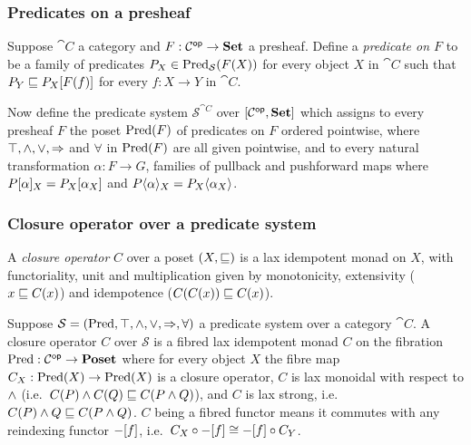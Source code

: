 \subsubsection{Predicates on a presheaf}

Suppose $\cat{C}$ a category and $F: \mathcal{C}^{\mathsf{op}} \to \mathbf{Set}$ a presheaf. Define a \emph{predicate on $F$} to be
a family of predicates $P_X \in \mathrm{Pred}_\mathcal{S}(F(X))$ for every object $X$ in $\cat{C}$ such that $P_Y
\sqsubseteq P_X[F(f)]$ for every $f: X \to Y$ in $\cat{C}$.

Now define the predicate system $\mathcal{S}^{\cat{C}}$ over $[\mathcal{C}^{\mathsf{op}},\mathbf{Set}]$ which assigns to every
presheaf $F$ the poset $\mathrm{Pred}(F)$ of predicates on $F$ ordered pointwise, where $\top, \wedge, \vee,
\Rightarrow$ and $\forall$ in $\mathrm{Pred}(F)$ are all given pointwise, and to every natural transformation $\alpha: F
\to G$, families of pullback and pushforward maps where $P[\alpha]_X = P_X[\alpha_X]$ and
$P\langle\alpha\rangle_X = P_X\langle\alpha_X\rangle$.

\subsubsection{Closure operator over a predicate system}

A \emph{closure operator} $C$ over a poset $(X, \sqsubseteq)$ is a lax idempotent monad on $X$, with functoriality,
unit and multiplication given by monotonicity, extensivity ($x \sqsubseteq C(x)$) and idempotence ($C(C(x)) \sqsubseteq
C(x)$).

Suppose $\mathcal{S} = (\mathrm{Pred}, \top, \wedge, \vee, \Rightarrow, \forall)$ a predicate system over a category
$\cat{C}$. A closure operator $C$ over $\mathcal{S}$ is a fibred lax idempotent monad $C$ on the fibration
$\mathrm{Pred}: \mathcal{C}^{\mathsf{op}} \to \mathbf{Poset}$ where for every object $X$ the fibre map $C_X: \mathrm{Pred}(X) \to \mathrm{Pred}(X)$ is a
closure operator, $C$ is lax monoidal with respect to $\wedge$ (i.e.~$C(P) \wedge C(Q) \sqsubseteq C(P \wedge Q)$),
and $C$ is lax strong, i.e.~$C(P) \wedge Q \sqsubseteq C(P \wedge Q)$. $C$ being a fibred functor means it commutes
with any reindexing functor $-[f]$, i.e.~$C_X \circ -[f] \cong -[f] \circ C_Y$.
